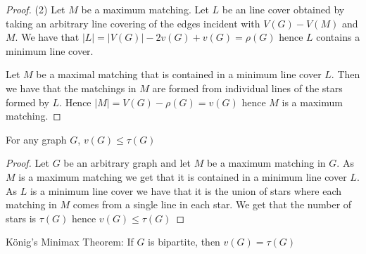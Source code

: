 \documentclass[12pt]{article}
\newenvironment{theorem}[2][Theorem]{\begin{trivlist}
\item[\hskip \labelsep {\bfseries #1}\hskip \labelsep {\bfseries #2.}]}{\end{trivlist}}
\newenvironment{exercise}[2][Exercise]{\begin{trivlist}
\item[\hskip \labelsep {\bfseries #1}\hskip \labelsep {\bfseries #2.}]}{\end{trivlist}}
\begin{document}
\begin{proof}{(2)}
    Let $M$ be a maximum matching. Let $L$ be an line cover obtained by taking an arbitrary line covering of the edges incident with $V(G)-V(M)$ and $M$. We have that $|L|=|V(G)|-2v(G)+v(G)=\rho(G)$ hence $L$ contains a minimum line cover.

    Let $M$ be a maximal matching that is contained in a minimum line cover $L$.
    Then we have that the matchings in $M$ are formed from individual lines of the stars formed by $L$. Hence $|M|=V(G)-\rho(G)=v(G)$ hence $M$ is a maximum matching.
\end{proof}


\begin{exercise}
    {1.0.4}
    For any graph $G$, $v(G)\leq \tau(G)$
\end{exercise}

\begin{proof}

    Let $G$ be an arbitrary graph and let $M$ be a maximum matching in $G$. As $M$ is a maximum matching we get that it is contained in a minimum line cover $L$. As $L$ is a minimum line cover we have that it is the union of stars where each matching in $M$ comes from a single line in each star. We get that the number of stars is $\tau(G)$ hence $v(G)\leq \tau(G)$
\end{proof}
\begin{theorem}
    {1.1.1}
    König's Minimax Theorem:
    If $G$ is bipartite, then $v(G)=\tau(G)$
\end{theorem}
\end{document}
